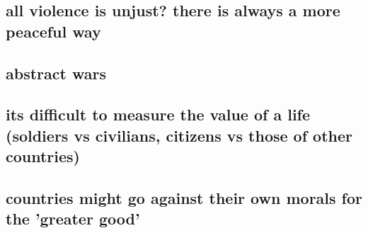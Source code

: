 \documentclass[letterpaper]{article}
\begin{document}
\subsection{all violence is unjust? there is always a more peaceful way}
\label{sec:org7158fc1}
\subsection{abstract wars}
\label{sec:org9e0dcd7}
\subsection{its difficult to measure the value of a life (soldiers vs civilians, citizens vs those of other countries)}
\label{sec:org15f9bc5}
\subsection{countries might go against their own morals for the 'greater good'}
\label{sec:org66aa1da}
\end{document}
